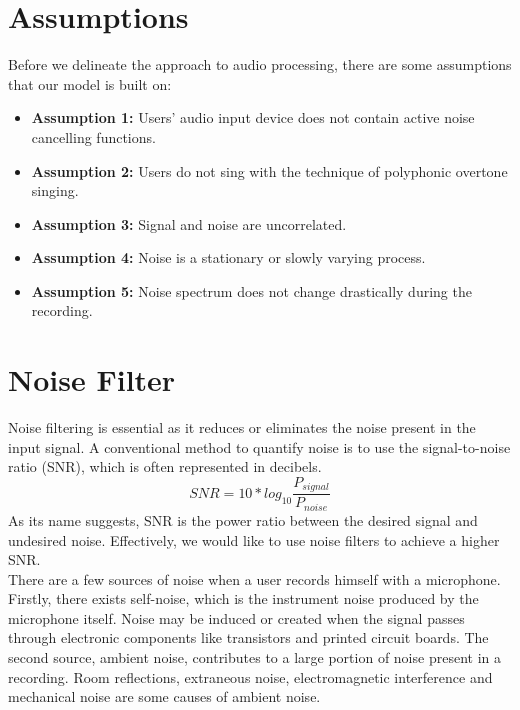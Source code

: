 \section{Assumptions}
Before we delineate the approach to audio processing, there are some assumptions that our model
is built on:
\begin{itemize}
    \item \textbf{Assumption 1:} Users' audio input device does not contain active noise cancelling functions.
    \item \textbf{Assumption 2:} Users do not sing with the technique of polyphonic overtone singing.
    \item \textbf{Assumption 3:} Signal and noise are uncorrelated.
    \item \textbf{Assumption 4:} Noise is a stationary or slowly varying process.
    \item \textbf{Assumption 5:} Noise spectrum does not change drastically during the recording.
\end{itemize}

\section{Noise Filter}
\label{sec:NF}
Noise filtering is essential as it reduces or eliminates the noise present in the input signal.
A conventional method to quantify noise is to use the signal-to-noise ratio (SNR), which is often 
represented in decibels.
\[SNR=10*log_{10}\frac{P_{signal}}{P_{noise}}\]
As its name suggests, SNR is the power ratio between the desired signal and undesired noise. Effectively,
we would like to use noise filters to achieve a higher SNR.\\ 
There are a few sources of noise when a user records himself with a microphone.
Firstly, there exists self-noise, which is the instrument noise produced by the microphone itself.
Noise may be induced or created when the signal passes through electronic components like transistors 
and printed circuit boards.
The second source, ambient noise, contributes to a large portion of noise present in a recording.
Room reflections, extraneous noise, electromagnetic interference and mechanical noise are some causes 
of ambient noise.  

